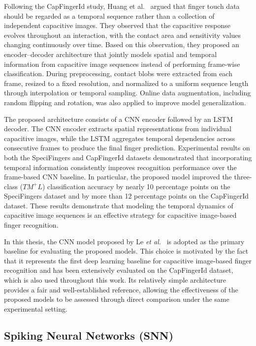 \documentclass[../main.tex]{subfiles}
\begin{document}
Following the CapFingerId study, Huang et al.~\cite{huang2024specifingers}
argued that finger touch data should be regarded as a temporal sequence rather
than a collection of independent capacitive images. They observed that the
capacitive response evolves throughout an interaction, with the contact area
and sensitivity values changing continuously over time. Based on this
observation, they proposed an encoder--decoder architecture that jointly
models spatial and temporal information from capacitive image sequences
instead of performing frame-wise classification. During preprocessing,
contact blobs were extracted from each frame, resized to a fixed resolution,
and normalized to a uniform sequence length through interpolation or temporal
sampling. Online data augmentation, including random flipping and rotation,
was also applied to improve model generalization.

The proposed architecture consists of a CNN encoder followed by an LSTM
decoder. The CNN encoder extracts spatial representations from individual
capacitive images, while the LSTM aggregates temporal dependencies across
consecutive frames to produce the final finger prediction. Experimental
results on both the SpeciFingers and CapFingerId datasets demonstrated that
incorporating temporal information consistently improves recognition
performance over the frame-based CNN baseline. In particular, the proposed
model improved the three-class ($TM^{+}L$) classification accuracy by nearly
10 percentage points on the SpeciFingers dataset and by more than 12
percentage points on the CapFingerId dataset. These results demonstrate that
modeling the temporal dynamics of capacitive image sequences is an effective
strategy for capacitive image-based finger recognition.

In this thesis, the CNN model proposed by Le \textit{et al.}~\cite{CapfingerId}
is adopted as the primary baseline for evaluating the proposed models.
This choice is motivated by the fact that it represents the first deep learning
baseline for capacitive image-based finger recognition and has been extensively
evaluated on the CapFingerId dataset, which is also used throughout this work.
Its relatively simple architecture provides a fair and well-established
reference, allowing the effectiveness of the proposed models to be assessed
through direct comparison under the same experimental setting.

\subsection{Spiking Neural Networks (SNN)}
\end{document}
